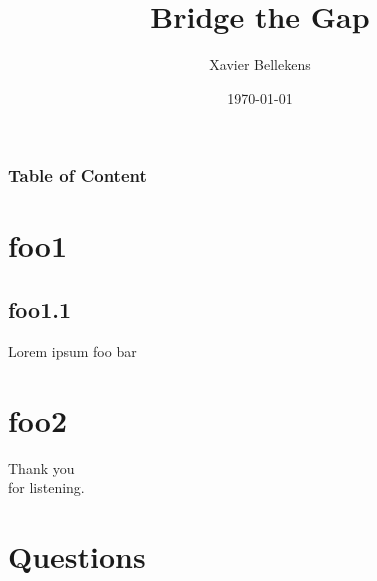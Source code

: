 \documentclass{beamer}
\author{Xavier Bellekens}
\title{Bridge the Gap}
\date{\today}
\begin{document}
\begin{frame}

\titlepage
\end{frame}

\begin{frame}
	\frametitle{Table of Content}
	\tableofcontents
\end{frame}

\section{foo1}
\subsection{foo1.1}
\begin{frame}{Lorem ipsum}
foo bar
\end{frame}



\section{foo2}
\begin{frame}
\vfill
\begin{center}\begin{Huge}Thank you \\[10pt]
for listening.\end{Huge}\vfill
\end{center}
\vfill
\end{frame}

\section{Questions}
\vspace*{-1cm}\hspace*{-1.8cm}
\end{document}
